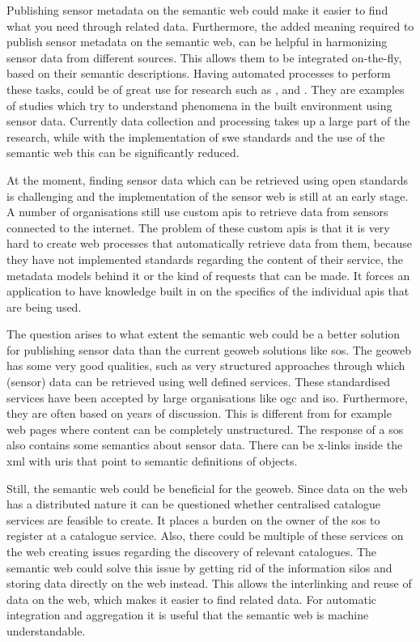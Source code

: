 Publishing sensor metadata on the semantic web could make it easier to find what you need through related data. Furthermore, the added meaning required to publish sensor metadata on the semantic web, can be helpful in harmonizing sensor data from different sources. This allows them to be integrated on-the-fly, based on their semantic descriptions. Having automated processes to perform these tasks, could be of great use for research such as \cite{UC:vanderHoeven}, \cite{UC:Hotterdam} and \cite{UC:Theunisse}. They are examples of studies which try to understand phenomena in the built environment using sensor data. Currently data collection and processing takes up a large part of the research, while with the implementation of \ac{swe} standards and the use of the semantic web this can be significantly reduced.  

At the moment, finding sensor data which can be retrieved using open standards is challenging and the implementation of the sensor web is still at an early stage. A number of organisations still use custom \acp{api} to retrieve data from sensors connected to the internet. The problem of these custom \ac{api}s is that it is very hard to create web processes that automatically retrieve data from them, because they have not implemented standards regarding the content of their service, the metadata models behind it or the kind of requests that can be made. It forces an application to have knowledge built in on the specifics of the individual \ac{api}s that are being used.  

The question arises to what extent the semantic web could be a better solution for publishing sensor data than the current geoweb solutions like \ac{sos}. The geoweb has some very good qualities, such as very structured approaches through which (sensor) data can be retrieved using well defined services. These standardised services have been accepted by large organisations like \ac{ogc} and \ac{iso}. Furthermore, they are often based on years of discussion. This is different from for example web pages where content can be completely unstructured. The response of a \ac{sos} also contains some semantics about sensor data. There can be x-links inside the \ac{xml} with \ac{uri}s that point to semantic definitions of objects. 

Still, the semantic web could be beneficial for the geoweb. Since data on the web has a distributed nature it can be questioned whether centralised catalogue services are feasible to create. It places a burden on the owner of the \ac{sos} to register at a catalogue service. Also, there could be multiple of these services on the web creating issues regarding the discovery of relevant catalogues. The semantic web could solve this issue by getting rid of the information silos and storing data directly on the web instead. This allows the interlinking and reuse of data on the web, which makes it easier to find related data. For automatic integration and aggregation it is useful that the semantic web is machine understandable. 


